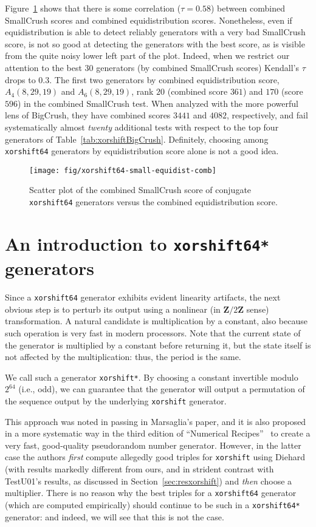 \documentclass{acmsmalltr}
\newcommand{\Z}{\mathbf Z}
\newcommand{\xorshift}[1][]{\texttt{xorshift#1}\xspace}
\newcommand{\xorshifts}[1][]{\texttt{xorshift#1*}\xspace}
\begin{document}
Figure~\ref{fig:xorshiftsmallequidistcomb} shows that there is some
correlation ($\tau=0.58$) between combined SmallCrush scores and combined equidistribution
scores. Nonetheless, even if equidistribution is able to detect reliably
generators with a very bad SmallCrush score, is not so good at detecting the
generators with the best score, as is visible
from the quite noisy lower left part of the plot.
Indeed, when we restrict our attention
to the best $30$ generators (by combined SmallCrush scores) Kendall's $\tau$ drops to $0.3$.
The first two
generators by combined equidistribution score, $A_4(8,29,19)$ and
$A_6(8,29,19)$, rank $20$ (combined score $361$) and $170$ (score $596$) in the
combined SmallCrush test. When analyzed with the more powerful lens of BigCrush,
they have combined scores $3441$ and $4082$, respectively, and fail
systematically almost \emph{twenty} additional tests with respect to the top 
four generators of Table~\ref{tab:xorshiftBigCrush}. Definitely, choosing
among \xorshift[64] generators by equidistribution score alone is not a good idea.

\begin{figure}
\centering
\texttt{[image: fig/xorshift64-small-equidist-comb]}
\caption{\label{fig:xorshiftsmallequidistcomb}Scatter plot of the combined SmallCrush score of conjugate \xorshift[64] generators versus the combined equidistribution score.}
\end{figure}




\section{An introduction to \xorshifts[64] generators}

Since a \xorshift[64] generator exhibits evident linearity artifacts, the next
obvious step is to perturb its output using a nonlinear (in $\Z/2\Z$ sense) transformation. A natural candidate is multiplication by a
constant, also because such operation is very fast in modern
processors. Note that the current state of the generator is multiplied by a
constant before returning it, but the state itself is not affected by the
multiplication: thus, the period is the same.

We call such a generator \xorshifts. By choosing a constant invertible modulo
$2^{64}$ (i.e., odd), we can guarantee that the generator will output a
permutation of the sequence output by the underlying \xorshift generator.

This approach was noted in passing in Marsaglia's paper, and it is also proposed
in a more systematic way in the third edition of ``Numerical
Recipes''~\cite{PTVNR} to create a very fast, good-quality pseudorandom number
generator. However, in the latter case the authors \emph{first} compute
allegedly good triples for \xorshift using Diehard (with results markedly
different from ours, and in strident contrast with TestU01's results, as
discussed in Section~\ref{sec:resxorshift}) and \emph{then} choose a multiplier.
There is no reason why the best triples for a
\xorshift[64] generator (which are computed empirically) should continue to be
such in a \xorshifts[64] generator: and indeed, we will see that this is not the
case.
\end{document}
